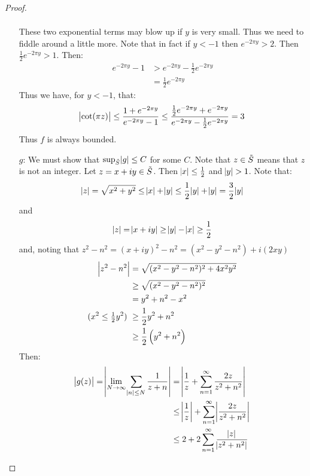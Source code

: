 \begin{proof}
\begin{enumerate}
\begin{align*}
    \end{align*}
    These two exponential terms may blow up if $y$ is very small. Thus we need to fiddle around a little more. Note that in fact if $y<-1$ then $e^{-2 \pi y} > 2$. Then $\frac{1}{2} e^{-2 \pi y} > 1$. Then:
    \begin{align*}
        e^{-2 \pi y} -1 &> e^{-2 \pi y} - \frac{1}{2} e^{-2 \pi y}\\
        &= \frac{1}{2} e^{-2 \pi y}
    \end{align*}
    Thus we have, for $y<-1$, that:
    \begin{align*}
        \abs{\cot(\pi z)} \leq \frac{1+e^{-2 \pi y}}{e^{-2\pi y} - 1} \leq \frac{\frac{1}{2} e^{-2\pi y} +e^{-2 \pi y}}{e^{-2 \pi y} - \frac{1}{2}e^{-2 \pi y}} = 3
    \end{align*}
    Thus $f$ is always bounded.
    \item[$g$:] We must show that $\sup_{\Tilde{S}} \abs{g} \leq C $ for some $C$. Note that $z \in \Tilde{S}$ means that $z$ is not an integer. Let $z = x+iy \in \Tilde{S}$. Then $\abs{x} \leq \frac{1}{2}$ and $\abs{y} > 1$. Note that:
    \begin{align*}
        \abs{z} = \sqrt{x^2 + y^2} \leq \abs{x} + \abs{y} \leq \frac{1}{2}\abs{y} + \abs{y} = \frac{3}{2} \abs{y}
    \end{align*}
    and
    \begin{align*}
        \abs{z} = \abs{x+iy} \geq \abs{y} - \abs{x} \geq \frac{1}{2}
    \end{align*}
    and, noting that $z^2-n^2 = (x+iy)^2 -n^2 = (x^2 - y^2 -n^2) + i(2 xy)$
    \begin{align*}
        \abs{z^2 - n^2} &= \sqrt{(x^2 - y^2 -n^2)^2 + 4 x^2y^2}\\ &\geq \sqrt{(x^2 - y^2 -n^2)^2}\\
        &= y^2 + n^2 - x^2\\
        \text{($x^2\leq \tfrac{1}{2}y^2$) } &\geq \frac{1}{2} y^2 + n^2\\
        &\geq \frac{1}{2} \left( y^2 + n^2 \right)
    \end{align*}
    Then:
    \begin{align*}
        \abs{g(z)} = \abs{\lim_{N \to \infty } \sum_{\abs{n } \leq N} \frac{1}{z+n}} &= \abs{\frac{1}{z} + \sum_{n=1}^\infty \frac{2z}{z^2+n^2}}\\
        &\leq \abs{\frac{1}{z}} + \sum_{n=1}^\infty \abs{\frac{2z}{z^2+n^2}}\\
        &\leq 2 + 2 \sum_{n=1}^\infty \frac{\abs{z}}{\abs{z^2 + n^2}}\\

\end{align*}
\end{enumerate}
\end{proof}
